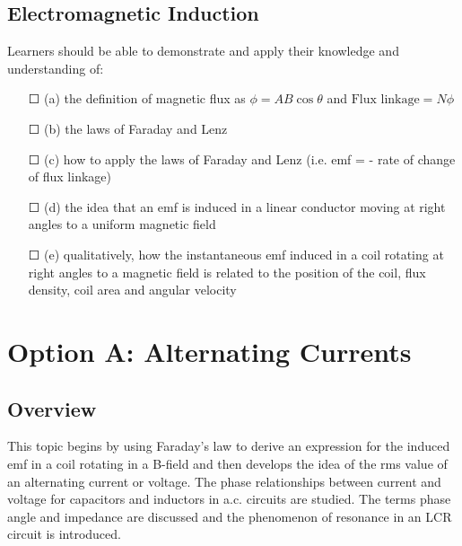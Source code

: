 \subsection{Electromagnetic Induction}Learners should be able to demonstrate and apply their knowledge and
understanding of:
\begin{itemize}
	\item[\Large{$\Square$}] (a) the definition of magnetic flux as \( \phi = AB \cos \theta \) and
	\(\text{Flux linkage} = N \phi \)
	\item[\Large{$\Square$}]	(b) the laws of Faraday and Lenz
	\item[\Large{$\Square$}]	(c) how to apply the laws of Faraday and Lenz (i.e. emf = - rate of change of flux	linkage)
	\item[\Large{$\Square$}]	(d) the idea that an emf is induced in a linear conductor moving at right angles to	a uniform magnetic field
	\item[\Large{$\Square$}]	(e) qualitatively, how the instantaneous emf induced in a coil rotating at right angles to a magnetic field is related to the position of the \sq coil, flux \sq density, \sq coil area and \sq angular velocity
\end{itemize} 
\section*{Option A: Alternating Currents}
\subsection*{Overview}
This topic begins by using Faraday’s law to derive an expression for the induced emf
in a coil rotating in a B-field and then develops the idea of the rms value of an
alternating current or voltage. The phase relationships between current and voltage
for capacitors and inductors in a.c. circuits are studied. The terms phase angle and
impedance are discussed and the phenomenon of resonance in an LCR circuit is
introduced.

